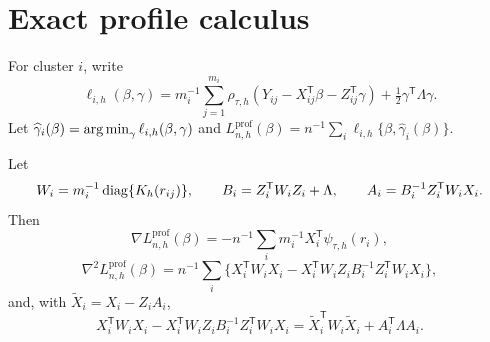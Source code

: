 \section{Exact profile calculus}\label{supp:profile}

For cluster $i$, write
\[
 \ell_{i,h}(\beta,\gamma)
 =m_i^{-1}\sum_{j=1}^{m_i}\rho_{\tau,h}(Y_{ij}-X_{ij}^{\mathsf T}\beta-Z_{ij}^{\mathsf T}\gamma)
 +\tfrac12\gamma^{\mathsf T}\Lambda\gamma.
\]
Let $\widehat\gamma_i(\beta)=\operatorname*{arg\,min}_{\gamma}\ell_{i,h}(\beta,\gamma)$ and
$L_{n,h}^{\mathrm{prof}}(\beta)=n^{-1}\sum_i\ell_{i,h}\{\beta,\widehat\gamma_i(\beta)\}$.

\begin{proposition}\label{prop:supp-profile}
Let
\[
 W_i=m_i^{-1}\operatorname{diag}\{K_h(r_{ij})\},\qquad
 B_i=Z_i^{\mathsf T}W_iZ_i+\Lambda,\qquad
 A_i=B_i^{-1}Z_i^{\mathsf T}W_iX_i.
\]
Then
\begin{equation}\label{eq:supp-gradient}
 \nabla L_{n,h}^{\mathrm{prof}}(\beta)
 =-n^{-1}\sum_i m_i^{-1}X_i^{\mathsf T}\psi_{\tau,h}(r_i),
\end{equation}
\begin{equation}\label{eq:supp-hessian}
 \nabla^2L_{n,h}^{\mathrm{prof}}(\beta)
 =n^{-1}\sum_i\{X_i^{\mathsf T}W_iX_i-X_i^{\mathsf T}W_iZ_iB_i^{-1}Z_i^{\mathsf T}W_iX_i\},
\end{equation}
and, with $\widetilde X_i=X_i-Z_iA_i$,
\begin{equation}\label{eq:supp-identity}
 X_i^{\mathsf T}W_iX_i-X_i^{\mathsf T}W_iZ_iB_i^{-1}Z_i^{\mathsf T}W_iX_i
 =\widetilde X_i^{\mathsf T}W_i\widetilde X_i+A_i^{\mathsf T}\Lambda A_i.
\end{equation}
\end{proposition}

